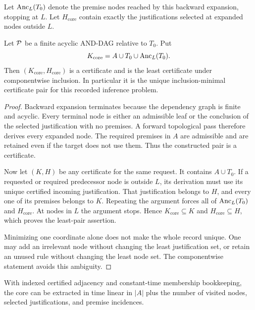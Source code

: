 Let $\operatorname{Anc}_L(T_0)$ denote the premise nodes reached by this backward expansion, stopping at $L$. Let $H_{\mathrm{core}}$ contain exactly the justifications selected at expanded nodes outside $L$.

\begin{PPTtheorem}
\label{PPT:res:4:3}
\label{PPT:thm:and-core}
Let $\mathcal P$ be a finite acyclic AND-DAG relative to $T_0$. Put
\[
K_{\mathrm{core}}=A\cup T_0\cup\operatorname{Anc}_L(T_0).
\]
Then $(K_{\mathrm{core}},H_{\mathrm{core}})$ is a certificate and is the least certificate under componentwise inclusion. In particular it is the unique inclusion-minimal certificate pair for this recorded inference problem.
\end{PPTtheorem}

\begin{proof}
Backward expansion terminates because the dependency graph is finite and acyclic. Every terminal node is either an admissible leaf or the conclusion of the selected justification with no premises. A forward topological pass therefore derives every expanded node. The required premises in $A$ are admissible and are retained even if the target does not use them. Thus the constructed pair is a certificate.

Now let $(K,H)$ be any certificate for the same request. It contains $A\cup T_0$. If a requested or required predecessor node is outside $L$, its derivation must use its unique certified incoming justification. That justification belongs to $H$, and every one of its premises belongs to $K$. Repeating the argument forces all of $\operatorname{Anc}_L(T_0)$ and $H_{\mathrm{core}}$. At nodes in $L$ the argument stops. Hence $K_{\mathrm{core}}\subseteq K$ and $H_{\mathrm{core}}\subseteq H$, which proves the least-pair assertion.

Minimizing one coordinate alone does not make the whole record unique. One may add an irrelevant node without changing the least justification set, or retain an unused rule without changing the least node set. The componentwise statement avoids this ambiguity.
\end{proof}

\begin{PPTcorollary}
\label{PPT:res:4:4}
With indexed certified adjacency and constant-time membership bookkeeping, the core can be extracted in time linear in $|A|$ plus the number of visited nodes, selected justifications, and premise incidences.
\end{PPTcorollary}

